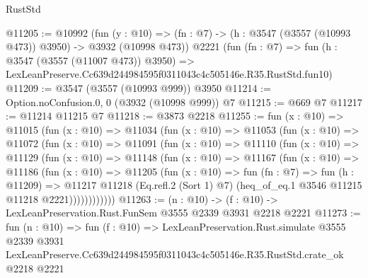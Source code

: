 \begin{lexlean}{RustStd}
\begin{coremodule}
@11205 := @10992
    (fun (y : @10) => (fn : @7) -> (h : @3547 (@3557 (@10993 @473)) @3950) -> @3932 (@10998 @473))
    @2221
    (fun (fn : @7) =>
    fun (h : @3547 (@3557 (@11007 @473)) @3950) =>
    LexLeanPreserve.Cc639d244984595f0311043c4c505146e.R35.RustStd.fun10)
@11209 := @3547 (@3557 (@10993 @999)) @3950
@11214 := Option.noConfusion.{0, 0} (@3932 (@10998 @999)) @7
@11215 := @669 @7
@11217 := @11214 @11215 @7
@11218 := @3873 @2218
@11255 := fun (x : @10) =>
  @11015
    (fun (x : @10) =>
    @11034
      (fun (x : @10) =>
      @11053
        (fun (x : @10) =>
        @11072
          (fun (x : @10) =>
          @11091
            (fun (x : @10) =>
            @11110
              (fun (x : @10) =>
              @11129
                (fun (x : @10) =>
                @11148
                  (fun (x : @10) =>
                  @11167
                    (fun (x : @10) =>
                    @11186
                      (fun (x : @10) =>
                      @11205
                        (fun (x : @10) =>
                        fun (fn : @7) =>
                        fun (h : @11209) =>
                        @11217
                          @11218
                          (Eq.refl.{2} (Sort 1) @7)
                          (heq_of_eq.{1} @3546 @11215 @11218 @2221))))))))))))
@11263 := (n : @10) -> (f : @10) -> LexLeanPreservation.Rust.FunSem @3555 @2339 @3931 @2218 @2221
@11273 := fun (n : @10) =>
  fun (f : @10) =>
  LexLeanPreservation.Rust.simulate
    @3555
    @2339
    @3931
    LexLeanPreserve.Cc639d244984595f0311043c4c505146e.R35.RustStd.crate_ok
    @2218
    @2221
\end{coremodule}
\end{lexlean}
